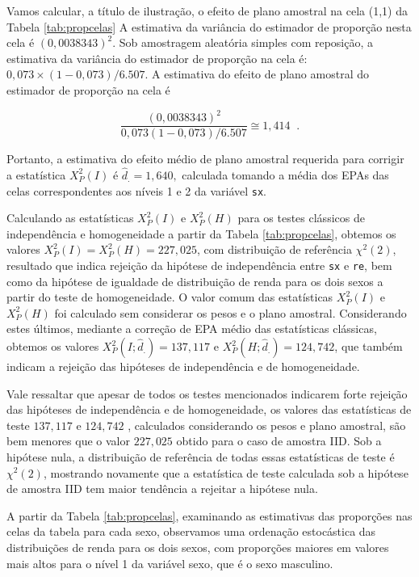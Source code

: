 \documentclass[]{book}
\theoremstyle{definition}
\theoremstyle{definition}
\theoremstyle{definition}
\theoremstyle{remark}
\begin{document}
Vamos calcular, a título de ilustração, o efeito de plano amostral na
cela (1,1) da Tabela \ref{tab:propcelas} A estimativa da variância do
estimador de proporção nesta cela é \(\left(0,0038343\right) ^{2}\). Sob
amostragem aleatória simples com reposição, a estimativa da variância do
estimador de proporção na cela é:
\(0,073\times \left( 1-0,073\right) /6.507\). A estimativa do efeito de
plano amostral do estimador de proporção na cela é

\[
\frac{\left( 0,0038343\right) ^{2}}{0,073\left( 1-0,073\right) /6.507}\cong
1,414\;\;. 
\]

Portanto, a estimativa do efeito médio de plano amostral requerida para
corrigir a estatística \(X_{P}^{2}\left( I\right)\) é
\(\hat{d}_{.}=1,640,\) calculada tomando a média dos EPAs das celas
correspondentes aos níveis 1 e 2 da variável \texttt{sx}.

Calculando as estatísticas \(X_{P}^{2}\left( I\right)\) e
\(X_{P}^{2}\left( H\right)\) para os testes clássicos de independência e
homogeneidade a partir da Tabela \ref{tab:propcelas}, obtemos os valores
\(X_{P}^{2}\left( I\right) =X_{P}^{2}\left( H\right) =227,025\), com
distribuição de referência \(\chi ^{2}\left( 2\right)\), resultado que
indica rejeição da hipótese de independência entre \texttt{sx} e
\texttt{re}, bem como da hipótese de igualdade de distribuição de renda
para os dois sexos a partir do teste de homogeneidade. O valor comum das
estatísticas \(X_{P}^{2}\left( I\right)\) e \(X_{P}^{2}\left( H\right)\)
foi calculado sem considerar os pesos e o plano amostral. Considerando
estes últimos, mediante a correção de EPA médio das estatísticas
clássicas, obtemos os valores
\(X_{P}^{2}\left( I;\hat{d} _{.}\right) =137,117\) e
\(X_{P}^{2}\left( H;\hat{d}_{.}\right) =124,742\), que também indicam a
rejeição das hipóteses de independência e de homogeneidade.

Vale ressaltar que apesar de todos os testes mencionados indicarem forte
rejeição das hipóteses de independência e de homogeneidade, os valores
das estatísticas de teste \(137,117\) e \(124,742\) , calculados
considerando os pesos e plano amostral, são bem menores que o valor
\(227,025\) obtido para o caso de amostra IID. Sob a hipótese nula, a
distribuição de referência de todas essas estatísticas de teste é
\(\chi ^{2}\left( 2\right)\), mostrando novamente que a estatística de
teste calculada sob a hipótese de amostra IID tem maior tendência a
rejeitar a hipótese nula.

A partir da Tabela \ref{tab:propcelas}, examinando as estimativas das
proporções nas celas da tabela para cada sexo, observamos uma ordenação
estocástica das distribuições de renda para os dois sexos, com
proporções maiores em valores mais altos para o nível 1 da variável
sexo, que é o sexo masculino.
\end{document}

